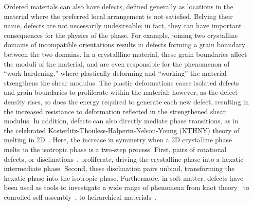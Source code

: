 Ordered materials can also have defects, defined generally as locations in the material where the preferred local arrangement is not satisfied.
Belying their name, defects are not necessarily undesireable; in fact, they can have important consequences for the physics of the phase.
For example, joining two crystalline domains of incompatible orientations results in defects forming a grain boundary between the two domains.
In a crystallline material, these grain boundaries affect the moduli of the material, and are even responsible for the phenomenon of ``work hardening,'' where plastically deforming and ``working'' the material strengthens the shear modulus.
The plastic deformations cause isolated defects and grain boundaries to proliferate within the material; however, as the defect density rises, so does the energy required to generate each new defect, resulting in the increased resistance to deformation reflected in the strengthened shear modulus.
In addition, defects can also directly mediate phase transitions, as in the celebrated Kosterlitz-Thouless-Halperin-Nelson-Young (KTHNY) theory of melting in 2D~\cite{RN161,RN162,RN163}.
Here, the increase in symmetry when a 2D crystalline phase melts to the isotropic phase is a two-step process.
First, pairs of rotational defects, or disclinations~\cite{RN61,RN203}, proliferate, driving the crystalline phase into a hexatic intermediate phase.
Second, these disclination pairs unbind, transforming the hexatic phase into the isotropic phase.
Furthermore, in soft matter, defects have been used as tools to investigate a wide range of phenomena from knot theory~\cite{RN156} to conrolled self-assembly~\cite{RN43,RN50,RN150,RN157}, to heirarchical materials~\cite{RN164,RN159,RN27}.

